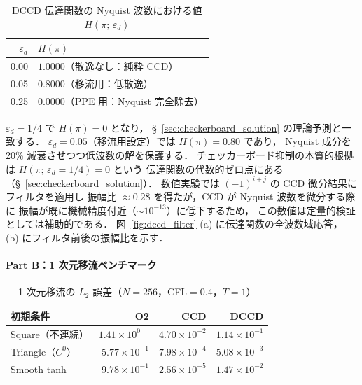 \begin{table}[htbp]
\centering
\caption{DCCD 伝達関数の Nyquist 波数における値 $H(\pi;\,\varepsilon_d)$}
\label{tab:dccd_transfer}
\renewcommand{\arraystretch}{1.3}
\begin{tabular}{rl}
\toprule
$\varepsilon_d$ & $H(\pi)$ \\
\midrule
0.00 & $1.0000$（散逸なし：純粋 CCD）\\
0.05 & $0.8000$（移流用：低散逸）\\
0.25 & $0.0000$（PPE 用：Nyquist 完全除去）\\
\bottomrule
\end{tabular}
\end{table}

$\varepsilon_d = 1/4$ で $H(\pi) = 0$ となり，
§~\ref{sec:checkerboard_solution} の理論予測と一致する．
$\varepsilon_d = 0.05$（移流用設定）では $H(\pi) = 0.80$ であり，
Nyquist 成分を 20\% 減衰させつつ低波数の解を保護する．
チェッカーボード抑制の本質的根拠は $H(\pi;\,\varepsilon_d = 1/4) = 0$ という
伝達関数の代数的ゼロ点にある（§~\ref{sec:checkerboard_solution}）．
数値実験では $(-1)^{i+j}$ の CCD 微分結果にフィルタを適用し
振幅比 $\approx 0.28$ を得たが，CCD が Nyquist 波数を微分する際に
振幅が既に機械精度付近（$\sim\!10^{-13}$）に低下するため，
この数値は定量的検証としては補助的である．
図~\ref{fig:dccd_filter} (a) に伝達関数の全波数域応答，
(b) にフィルタ前後の振幅比を示す．

\paragraph{Part B：1 次元移流ベンチマーク}

\begin{table}[htbp]
\centering
\caption{1 次元移流の $L_2$ 誤差（$N=256$，CFL$=0.4$，$T=1$）}
\label{tab:dccd_l2_bench}
\renewcommand{\arraystretch}{1.3}
\begin{tabular}{lrrr}
\toprule
初期条件 & O2 & CCD & DCCD \\
\midrule
Square（不連続） & $1.41\times10^{0\phantom{-}}$ & $4.70\times10^{-2}$ & $1.14\times10^{-1}$ \\
Triangle（$C^0$） & $5.77\times10^{-1}$ & $7.98\times10^{-4}$ & $5.08\times10^{-3}$ \\
Smooth tanh       & $9.78\times10^{-1}$ & $2.56\times10^{-5}$ & $1.47\times10^{-2}$ \\
\bottomrule
\end{tabular}
\end{table}

